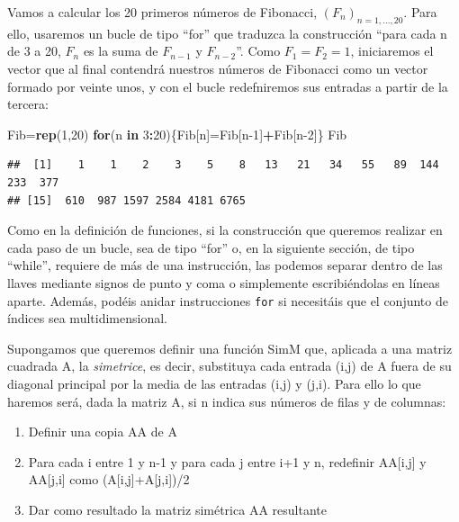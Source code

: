 \documentclass[]{book}
\newenvironment{Shaded}{\begin{snugshade}}{\end{snugshade}}
\newcommand{\ControlFlowTok}[1]{\textcolor[rgb]{0.13,0.29,0.53}{\textbf{#1}}}
\newcommand{\DecValTok}[1]{\textcolor[rgb]{0.00,0.00,0.81}{#1}}
\newcommand{\KeywordTok}[1]{\textcolor[rgb]{0.13,0.29,0.53}{\textbf{#1}}}
\newcommand{\NormalTok}[1]{#1}
\newcommand{\OperatorTok}[1]{\textcolor[rgb]{0.81,0.36,0.00}{\textbf{#1}}}
\providecommand{\tightlist}{%
  \setlength{\itemsep}{0pt}\setlength{\parskip}{0pt}}
\theoremstyle{definition}
\theoremstyle{definition}
\theoremstyle{definition}
\theoremstyle{remark}
\let\BeginKnitrBlock\begin \let\EndKnitrBlock\end
\begin{document}
Vamos a calcular los 20 primeros números de Fibonacci, \((F_n)_{n=1,\ldots,20}\). Para ello, usaremos un bucle de tipo ``for'' que traduzca la construcción ``para cada n de 3 a 20, \(F_n\) es la suma de \(F_{n-1}\) y \(F_{n-2}\)''. Como \(F_1=F_2=1\), iniciaremos el vector que al final contendrá nuestros números de Fibonacci como un vector formado por veinte unos, y con el bucle redefniremos sus entradas a partir de la tercera:

\begin{Shaded}
\begin{Highlighting}[]
\NormalTok{Fib=}\KeywordTok{rep}\NormalTok{(}\DecValTok{1}\NormalTok{,}\DecValTok{20}\NormalTok{) }
\ControlFlowTok{for}\NormalTok{(n }\ControlFlowTok{in} \DecValTok{3}\OperatorTok{:}\DecValTok{20}\NormalTok{)\{Fib[n]=Fib[n}\DecValTok{-1}\NormalTok{]}\OperatorTok{+}\NormalTok{Fib[n}\DecValTok{-2}\NormalTok{]\} }
\NormalTok{Fib}
\end{Highlighting}
\end{Shaded}

\begin{verbatim}
##  [1]    1    1    2    3    5    8   13   21   34   55   89  144  233  377
## [15]  610  987 1597 2584 4181 6765
\end{verbatim}

Como en la definición de funciones, si la construcción que queremos realizar en cada paso de un bucle, sea de tipo ``for'' o, en la siguiente sección, de tipo ``while'', requiere de más de una instrucción, las podemos separar dentro de las llaves mediante signos de punto y coma o simplemente escribiéndolas en líneas aparte. Además, podéis anidar instrucciones \texttt{for} si necesitáis que el conjunto de índices sea multidimensional.

\BeginKnitrBlock{example}
\protect\hypertarget{exm:unnamed-chunk-375}{}{\label{exm:unnamed-chunk-375} }Supongamos que queremos definir una función SimM que, aplicada a una matriz cuadrada A, la \emph{simetrice}, es decir, substituya cada entrada (i,j) de A fuera de su diagonal principal por la media de las entradas (i,j) y (j,i). Para ello lo que haremos será, dada la matriz A, si n indica sus números de filas y de columnas:
\EndKnitrBlock{example}

\begin{enumerate}
\def\labelenumi{\arabic{enumi}.}
\tightlist
\item
  Definir una copia AA de A
\item
  Para cada i entre 1 y n-1 y para cada j entre i+1 y n, redefinir AA{[}i,j{]} y AA{[}j,i{]} como (A{[}i,j{]}+A{[}j,i{]})/2
\item
  Dar como resultado la matriz simétrica AA resultante
\end{enumerate}
\end{document}
